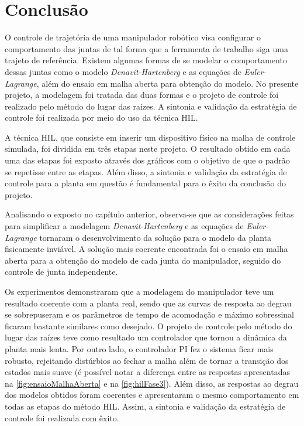 \chapter{Conclusão}

O controle de trajetória de uma manipulador robótico visa configurar o comportamento das juntas de tal 
forma que a ferramenta de trabalho siga uma trajeto de referência. Existem algumas formas de se modelar
o comportamento dessas juntas como o modelo \textit{Denavit-Hartenberg} e as equações de \textit{Euler-Lagrange},
além do ensaio em malha aberta para obtenção do modelo. No presente projeto, a modelagem foi tratada das duas formas
e o projeto de controle foi realizado pelo método do lugar das raízes. A sintonia e validação da estratégia de controle
foi realizada por meio do uso da técnica HIL.

A técnica HIL, que consiste em inserir um dispositivo físico na malha de controle simulada, foi dividida
em três etapas neste projeto. O resultado obtido em cada uma das etapas foi exposto através
dos gráficos com o objetivo de que o padrão se repetisse entre as etapas. Além disso, a sintonia
e validação da estratégia de controle para a planta em questão é fundamental para o êxito da 
conclusão do projeto.

Analisando o exposto no capítulo anterior, observa-se que as considerações feitas para simplificar
a modelagem \textit{Denavit-Hartenberg} e as equações de \textit{Euler-Lagrange} tornaram o desenvolvimento
da solução para o modelo da planta fisicamente inviável. A solução mais coerente encontrada foi o ensaio 
em malha aberta para a obtenção do modelo de cada junta do manipulador, seguido do controle de junta independente.

Os experimentos demonstraram que a modelagem do manipulador teve um resultado coerente com a planta real, sendo que as curvas
de resposta ao degrau se sobrepuseram e os parâmetros de tempo de acomodação e máximo sobressinal ficaram bastante similares como desejado. 
O projeto de controle pelo método do lugar das raízes teve como resultado um controlador que tornou a dinâmica da 
planta mais lenta. Por outro lado, o controlador PI fez o sistema ficar mais robusto, rejeitando distúrbios ao fechar
a malha além de tornar a transição dos estados mais suave (é possível notar a diferença entre as respostas apresentadas na 
\autoref{fig:ensaioMalhaAberta} e na \autoref{fig:hilFase3}). Além disso, as respostas ao degrau dos modelos obtidos
foram coerentes e apresentaram o mesmo comportamento em todas as etapas do método HIL. Assim, a sintonia e
validação da estratégia de controle foi realizada com êxito.

